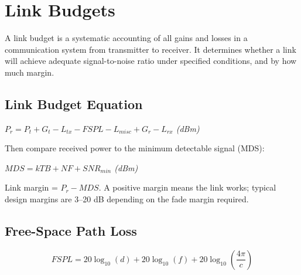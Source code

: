 \section{Link Budgets}\label{sec:wiki_link_budget}



A link budget is a systematic accounting of all gains and losses in a communication system from transmitter to receiver. It determines whether a link will achieve adequate signal-to-noise ratio under specified conditions, and by how much margin.

				

\subsection{Link Budget Equation}

				

\noindent\hspace*{1.2em}\textit{$P_r = P_t + G_t - L_{tx} - FSPL - L_{misc} + G_r - L_{rx}$   (dBm)}

				

Then compare received power to the minimum detectable signal (MDS):


				

\noindent\hspace*{1.2em}\textit{$MDS = kTB + NF + SNR_{min}$   (dBm)}

				

Link margin = $P_r - MDS$. A positive margin means the link works; typical design margins are 3–20 dB depending on the fade margin required.

				

\subsection{Free-Space Path Loss}

				


				
\[FSPL = 20\log_{10}(d) + 20\log_{10}(f) + 20\log_{10}\!\left(\dfrac{4\pi}{c}\right)\]

				

